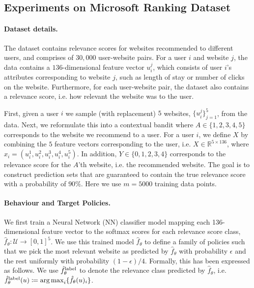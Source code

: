 \newpage



\subsection{Experiments on Microsoft Ranking Dataset}\label{sec:MSR_experiments_decrip}

\paragraph{Dataset details.}
The dataset contains relevance scores for websites recommended to different users, and comprises of $30,000$ user-website pairs. For a user $i$ and website $j$, the data contains a $136$-dimensional feature vector $u_i^j$, which consists of user $i$'s attributes corresponding to website $j$, such as length of stay or number of clicks on the website. Furthermore, for each user-website pair, the dataset also contains a relevance score, i.e. how relevant the website was to the user.

First, given a user $i$ we sample (with replacement) $5$ websites,  $\{u_i^j\}_{j=1}^5$, from the data. Next, we reformulate this into a contextual bandit where $A \in \{1,2,3,4,5\}$ corresponds to the website we recommend to a user. For a user $i$, we define $X$ by combining the $5$ feature vectors corresponding to the user, i.e. $X \in \mathbb{R}^{5 \times 136}$, where $x_i = (u^1_{i},u^2_{i},u^3_{i},u^4_{i}, u^5_{i})$. In addition, $Y \in\{0,1,2,3,4\}$ corresponds to the relevance score for the $A$'th website, i.e. the recommended website. The goal is to construct prediction sets that are guaranteed to contain the true relevance score with a probability of $90\%$. Here we use $m=5000$ training data points.

\paragraph{Behaviour and Target Policies.}
We first train a Neural Network (NN) classifier model mapping each 136-dimensional feature vector to the
softmax scores for each relevance score class, $\hat{f}_\theta:\mathcal{U} \rightarrow [0,1]^5$. We use this trained model $\hat{f}_\theta$ to define a family of policies such that we pick the most relevant website as predicted by $\hat{f}_\theta$ with probability $\epsilon$ and the rest uniformly with probability $(1-\epsilon)/4$. Formally, this has been expressed as follows. We use $\hat{f}^{\textup{label}}_\theta$ to denote the relevance class predicted by $\hat{f}_\theta$, i.e. $\hat{f}^{\textup{label}}_\theta(u) \coloneqq \operatorname*{arg\,max}_i\{\hat{f}_\theta(u)_i\}$. 

